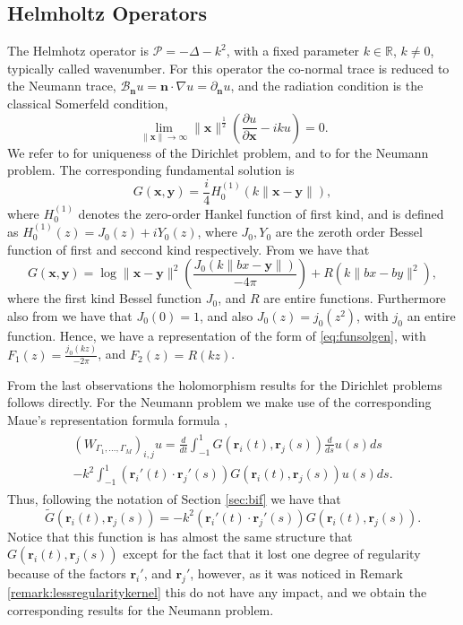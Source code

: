 \documentclass{article}
\newcommand{\IR}{{\mathbb R}}
\newcommand{\cP}{\mathcal{P}}
\newcommand{\bn}{\bm{n}}
\newcommand{\br}{\bm{r}}
\newcommand{\bx}{\bm{x}}
\newcommand{\by}{\bm{y}}
\begin{document}
\subsection{Helmholtz Operators}
The Helmhotz operator is $\cP = -\Delta -k^2$, with a fixed parameter $k \in \IR$, $k\neq 0$, typically called wavenumber. For this operator the co-normal trace is reduced to the  Neumann trace, $\mathbf{\mathcal{B}}_{\bn}u = \bn \cdot \nabla u  = \partial_{\bn} u$, and the radiation condition is the classical Somerfeld condition, 
$$
\lim_{\|\bx\| \rightarrow \infty}
\| \bx \|^{\frac{1}{2}}\left( \frac{\partial u}{\partial \bx}-i k u\right)=0.
$$
We refer to \cite{stephan1984augmented,kress1995inverse} for uniqueness of the Dirichlet problem, and to \cite{MONCH1996343} for the Neumann problem. The corresponding fundamental solution is
$$
G(\bx,\by) = \frac{i}{4}H^{(1)}_0(k \| \bx-\by\|),
$$
where $H^{(1)}_0$ denotes the zero-order Hankel function of first kind, and is defined as $H^{(1)}_0(z) = J_0(z) + i Y_0(z)$, where $J_0, Y_0$ are the zeroth order Bessel function of first and seccond kind respectively. From \cite[9.1.12 and 9.1.13]{abramowitz1965handbook} we have that 
$$
G(\bx,\by) = \log\|\bx-\by\|^2\left(\frac{J_0(k \|bx -\by\|)}{-4\pi}\right)+ R(k\|bx-by\|^2),
$$
where the first kind Bessel function $J_0$, and $R$ are entire functions.
Furthermore also from \cite[9.1.12]{abramowitz1965handbook} we have that $J_0(0) = 1$, and also $J_0(z) = j_0(z^2)$, with $j_0$ an entire function.  Hence, we have a representation of the form of \eqref{eq:funsolgen}, with $F_1(z) = \frac{j_0(k z)}{-2\pi}$, and $F_2(z) = R(k z)$.

From the last observations the holomorphism results for the Dirichlet problems follows directly. For the Neumann problem we make use of the corresponding Maue's representation formula  formula \cite[Corollary 3.3.24]{Sauter:2011},
\begin{align*}
\begin{split}
(W_{\Gamma_1,\hdots,\Gamma_M})_{i,j}u = \frac{d}{dt} \int_{-1}^1 G(\br_i(t),\br_j(s)) \frac{d}{ds} u(s) ds \\- k^2\int_{-1}^1 (\br_i'(t)\cdot \br_j'(s)) G(\br_i(t),\br_j(s))u(s) ds. 
\end{split}
\end{align*} 
Thus, following the notation of Section \ref{sec:bif} we have that 
$$
\widetilde{G}(\br_i(t),\br_j(s)) = -k^2 (\br_i'(t)\cdot \br_j'(s)) G(\br_i(t),\br_j(s)).
$$
Notice that this function is has almost the same structure that $G(\br_i(t),\br_j(s))$ except for the fact that it lost one degree of regularity because of the factors $\br_i'$, and $\br_j'$, however, as it was noticed in Remark \ref{remark:lessregularitykernel} this do not have any impact, and we obtain the corresponding results for the Neumann problem.
\end{document}
